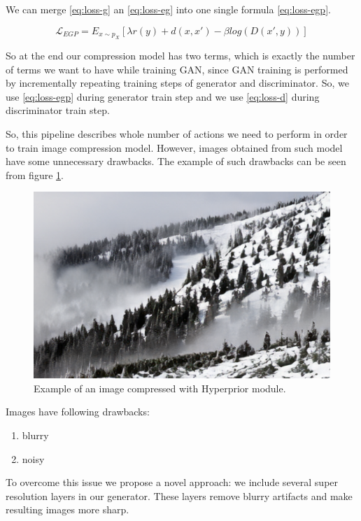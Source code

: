 We can merge \ref{eq:loss-g} an \ref{eq:loss-eg} into one single formula \ref{eq:loss-egp}.

\begin{equation}
    \label{eq:loss-egp}
    \mathcal{L}_{EGP}=E_{x\sim p_X}[\lambda r(y)+d(x, x')-\beta log(D(x',y))]
\end{equation}

So at the end our compression model has two terms, which is exactly the number of terms we want to have while training GAN, since GAN training is performed by incrementally repeating training steps of generator and discriminator. So, we use \ref{eq:loss-egp} during generator train step and we use \ref{eq:loss-d} during discriminator train step.

So, this pipeline describes whole number of actions we need to perform in order to train image compression model. However, images obtained from such model have some unnecessary drawbacks. The example of such drawbacks can be seen from figure \ref{forest-blurry}.

\begin{figure}[!ht]
    \centering
    \includegraphics[width=\textwidth]{figure/forest-blurry.png}
    \caption{Example of an image compressed with Hyperprior module.}
    \label{forest-blurry}
\end{figure}

Images have following drawbacks:

\begin{enumerate}
    \item blurry
    \item noisy
\end{enumerate}

To overcome this issue we propose a novel approach: we include several super resolution layers in our generator. These layers remove blurry artifacts and make resulting images more sharp.

